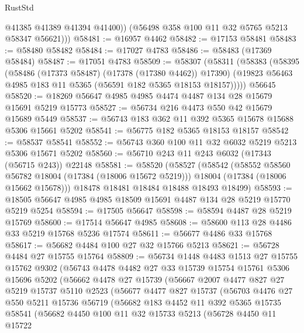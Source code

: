 \begin{lexlean}{RustStd}
\begin{coremodule}
            @41385
            @41389
            @41394
            @41400))
        (@56498 @358 @100 @11 @32 @5765 @5213 @58347 @56621)))
@58481 := @16957 @4462
@58482 := @17153 @58481
@58483 := @58480 @58482
@58484 := @17027 @4783
@58486 := @58483 (@17369 @58484)
@58487 := @17051 @4783
@58509 := @58307
    (@58311
      (@58383
        (@58395
          (@58486 (@17373 @58487) (@17378 (@17380 @4462)) @17390)
          (@19823 @56463 @4985 @183 @11 @5365 (@56591 @182 @5365 @18153 @18157)))))
    @56645
@58520 := @18269 @56647 @4985 @4985 @4474 @4487 @134 @28 @15679 @15691 @5219 @15773
@58527 := @56734 @216 @4473 @550 @42 @15679 @15689 @5449
@58537 := @56743 @183 @362 @11 @392 @5365 @15678 @15688 @5306 @15661 @5202
@58541 := @56775 @182 @5365 @18153 @18157
@58542 := @58537 @58541
@58552 := @56743 @360 @100 @11 @32 @6032 @5219 @5213 @5306 @15671 @5202
@58560 := @56710 @243 @11 @243 @6032 (@17343 (@56715 @243)) @22148
@58581 := @58520
    (@58527
      (@58542
        (@58552 @58560 @56782 @18004 (@17384 (@18006 @15672 @5219)))
        @18004
        (@17384 (@18006 @15662 @15678)))
      @18478
      @18481
      @18484
      @18488
      @18493
      @18499)
@58593 := @18505 @56647 @4985 @4985 @18509 @15691 @4487 @134 @28 @5219 @15770 @5219 @5254
@58594 := @17505 @56647
@58598 := @58594 @4487 @28 @5219 @15769
@58600 := @17514 @56647 @4985
@58608 := @58600 @113 @28 @4486 @33 @5219 @15768 @5236 @17574
@58611 := @56677 @4486 @33 @15768
@58617 := @56682 @4484 @100 @27 @32 @15766 @5213
@58621 := @56728 @4484 @27 @15755 @15764
@58809 := @56734
    @1448
    @4483
    @1513
    @27
    @15755
    @15762
    @9302
    (@56743
      @4478
      @4482
      @27
      @33
      @15739
      @15754
      @15761
      @5306
      @15696
      @5202
      (@56662
        @4478
        @27
        @15739
        (@56667
          @2007
          @4477
          @827
          @27
          @5219
          @15737
          @5110
          @2523
          (@56677
            @4477
            @827
            @15737
            (@56703
              @4476
              @27
              @550
              @5211
              @15736
              @56719
              (@56682
                @183
                @4452
                @11
                @392
                @5365
                @15735
                @58541
                (@56682
                  @4450
                  @100
                  @11
                  @32
                  @15733
                  @5213
                  (@56728
                    @4450
                    @11
                    @15722

\end{coremodule}
\end{lexlean}
